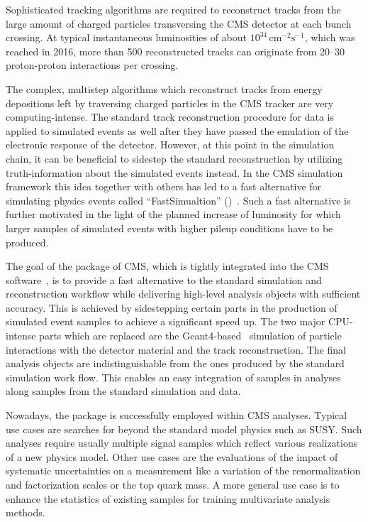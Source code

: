 Sophisticated tracking algorithms are required to reconstruct tracks from the large amount of charged particles transversing the CMS detector at each bunch crossing. At typical instantaneous luminosities of about $10^{34}\,\mathrm{cm}^{-2}\mathrm{s}^{-1}$, which was reached in 2016, more than 500 reconstructed tracks can originate from 20--30 proton-proton interactions per crossing.

The complex, multistep algorithms which reconstruct tracks from energy depositions left by traversing charged particles in the CMS tracker are very computing-intense. The standard track reconstruction procedure for data is applied to simulated events as well after they have passed the emulation of the electronic response of the detector. However, at this point in the simulation chain, it can be beneficial to sidestep the standard reconstruction by utilizing truth-information about the simulated events instead. In the CMS simulation framework this idea together with others has led to a fast alternative for simulating physics events called ``FastSimualtion'' (\FSIM[format=hyperbf]{})~\cite{fsimRahmat,fsimAndrea}. Such a fast alternative is further motivated in the light of the planned increase of luminosity for which larger samples of simulated events with higher pileup conditions have to be produced.

The goal of the \FSIM package of CMS, which is tightly integrated into the CMS software~\cite{Bayatian:922757}, is to provide a fast alternative to the standard simulation and reconstruction workflow while delivering high-level analysis objects with sufficient accuracy. This is achieved by sidestepping certain parts in the production of simulated event samples to achieve a significant speed up. The two major CPU-intense parts which are replaced are the Geant4-based~\cite{Agostinelli2003250} simulation of particle interactions with the detector material and the track reconstruction. The final analysis objects are indistinguishable from the ones produced by the standard simulation work flow. This enables an easy integration of \FSIM samples in analyses along samples from the standard simulation and data.

Nowadays, the \FSIM package is successfully employed within CMS analyses. Typical use cases are searches for beyond the standard model physics such as SUSY. Such analyses require usually multiple signal samples which reflect various realizations of a new physics model. Other use cases are the evaluations of the impact of systematic uncertainties on a measurement like a variation of the renormalization and factorization scales or the top quark mass. A more general use case is to enhance the statistics of existing samples for training multivariate analysis methods.

